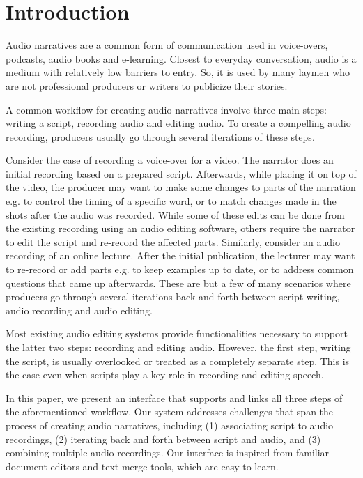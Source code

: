 \section{Introduction}
Audio narratives are a common form of communication used in voice-overs, podcasts, audio books and e-learning. Closest to everyday conversation, audio is a medium with relatively low barriers to entry. So, it is used by many laymen who are not professional producers or writers to publicize their stories.

A common workflow for creating audio narratives involve three main steps: writing a script, recording audio and editing audio. To create a compelling audio recording, producers usually go through several iterations of these steps.  

Consider the case of recording a voice-over for a video. The narrator does an initial recording based on a prepared script. Afterwards, while placing it on top of the video, the producer may want to make some changes to parts of the narration e.g. to control the timing of a specific word, or to match changes made in the shots after the audio was recorded. While some of these edits can be done from the existing recording using an audio editing software, others require the narrator to edit the script and re-record the affected parts. Similarly, consider an audio recording of an online lecture. After the initial publication, the lecturer may want to re-record or add parts e.g. to keep examples up to date, or to address common questions that came up afterwards. These are but a few of many scenarios where producers go through several iterations back and forth between script writing, audio recording and audio editing.


Most existing audio editing systems provide functionalities necessary
to support the latter two steps: recording and editing audio.
However, the first step, writing the script, is usually overlooked
or treated as a completely separate step. This is the case even
when scripts play a key role in recording and editing speech.
  

In this paper, we present an interface that supports and links all three steps of the aforementioned workflow. Our system addresses challenges that span the process of creating audio narratives, including (1) associating script to audio recordings, (2) iterating back and forth between script and audio, and (3) combining multiple audio recordings. Our interface is inspired from familiar document editors and text merge tools, which are easy to learn.

